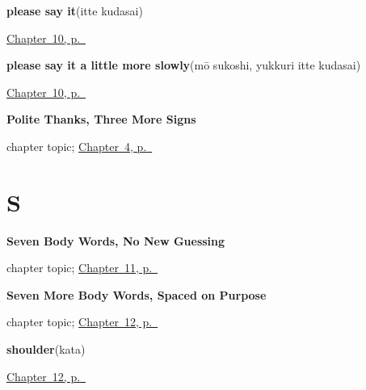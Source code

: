 \noindent\begin{minipage}[t]{\linewidth}
\raggedright
\textbf{please say it}\enspace\emph{}\enspace(itte kudasai)\par
\footnotesize \hyperref[ch:ja-slower-please]{Chapter~10, p.~\pageref*{ch:ja-slower-please}}
\end{minipage}\par\smallskip

\noindent\begin{minipage}[t]{\linewidth}
\raggedright
\textbf{please say it a little more slowly}\enspace\emph{}\enspace(mō sukoshi, yukkuri itte kudasai)\par
\footnotesize \hyperref[ch:ja-slower-please]{Chapter~10, p.~\pageref*{ch:ja-slower-please}}
\end{minipage}\par\smallskip

\noindent\begin{minipage}[t]{\linewidth}
\raggedright
\textbf{Polite Thanks, Three More Signs}\par
\footnotesize chapter topic; \hyperref[ch:ja-polite-thanks]{Chapter~4, p.~\pageref*{ch:ja-polite-thanks}}
\end{minipage}\par\smallskip

\section*{S}

\noindent\begin{minipage}[t]{\linewidth}
\raggedright
\textbf{Seven Body Words, No New Guessing}\par
\footnotesize chapter topic; \hyperref[ch:ja-body-seven]{Chapter~11, p.~\pageref*{ch:ja-body-seven}}
\end{minipage}\par\smallskip

\noindent\begin{minipage}[t]{\linewidth}
\raggedright
\textbf{Seven More Body Words, Spaced on Purpose}\par
\footnotesize chapter topic; \hyperref[ch:ja-body-seven-more]{Chapter~12, p.~\pageref*{ch:ja-body-seven-more}}
\end{minipage}\par\smallskip

\noindent\begin{minipage}[t]{\linewidth}
\raggedright
\textbf{shoulder}\enspace\emph{}\enspace(kata)\par
\footnotesize \hyperref[ch:ja-body-seven-more]{Chapter~12, p.~\pageref*{ch:ja-body-seven-more}}
\end{minipage}\par\smallskip

